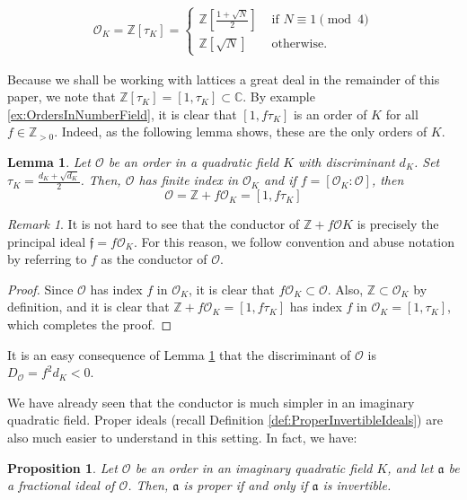 \documentclass{amsart}
\newtheorem{prop}[thm]{Proposition}
\newtheorem{lem}[thm]{Lemma}
\theoremstyle{definition}
\theoremstyle{remark}
\newtheorem{remark}[thm]{Remark}
\numberwithin{equation}{section}
\newcommand{\cO}{\mathcal O}
\newcommand{\fka}{\mathfrak a}
\newcommand{\fkf}{\mathfrak f}
\newcommand{\bbC}{\mathbb C}
\newcommand{\bbZ}{\mathbb Z}
\begin{document}
\begin{align}
 \cO_{K} = \bbZ\left[\tau_{K}\right] = 
     \begin{cases}
          \bbZ\left[\frac{1 + \sqrt{N}}{2}\right]  &   \text{ if } N \equiv 1 \pmod{4}\\
				  \bbZ\left[\sqrt{N}\right]                &   \text{ otherwise.}
		 \end{cases}
\end{align}

Because we shall be working with lattices a great deal in the remainder of this paper, we note that $\bbZ[\tau_{K}] = [1, \tau_{K}] \subset \bbC$. By example \ref{ex:OrdersInNumberField}, it is clear that $[1, f \tau_{K}]$ is an order of $K$ for all $f\in \bbZ_{>0}$. Indeed, as the following lemma shows, these are the only orders of $K$.

\begin{lem} \label{lem:OrdersInQuadraticFields}
Let $\cO$ be an order in a quadratic field $K$ with discriminant $d_{K}$. Set $\tau_{K} = \frac{d_{K} + \sqrt{d_{K}}}{2}$. Then, $\cO$ has finite index in $\cO_{K}$ and if $f = [\cO_{K}: \cO]$, then
\[
\cO = \bbZ + f\cO_{K} = [1, f \tau_{K}]
\]
\end{lem}

\begin{remark}
It is not hard to see that the conductor of $\bbZ + f \cO{K}$ is precisely the principal ideal $\fkf = f \cO_{K}$. For this reason, we follow convention and abuse notation by referring to $f$ as the conductor of $\cO$.
\end{remark}

\begin{proof}
Since $\cO$ has index $f$ in $\cO_{K}$, it is clear that $f \cO_{K} \subset \cO$. Also, $\bbZ \subset \cO_{K}$ by definition, and it is clear that $\bbZ + f \cO_{K} = [1, f \tau_{K}]$ has index $f$ in $\cO_{K} = [1, \tau_{K}]$, which completes the proof. 
\end{proof}

It is an easy consequence of Lemma \ref{lem:OrdersInQuadraticFields} that the discriminant of $\cO$ is $D_{\cO} = f^2 d_{K} < 0$. 

 We have already seen that the conductor is much simpler in an imaginary quadratic field. Proper ideals (recall Definition \ref{def:ProperInvertibleIdeals}) are also much easier to understand in this setting. In fact, we have:
 
 \begin{prop}
 Let $\cO$ be an order in an imaginary quadratic field $K$, and let $\fka$ be a fractional ideal of $\cO$. Then, $\fka$ is proper if and only if $\fka$ is invertible.
 \end{prop}
 
\end{document}
